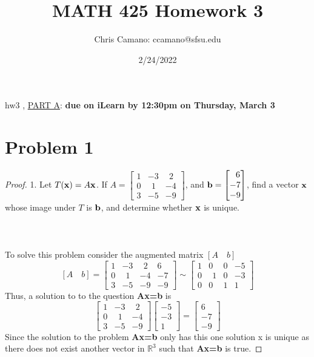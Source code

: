 \documentclass[12pt]{article}
\author{Chris Camano: ccamano@sfsu.edu}
\title{MATH 425 Homework 3 }
\date{2/24/2022}
\newcommand{\tab}{\\\\}
\newcommand{\sect}[1]{\section*{#1}}
\newcommand{\R}{\mathbb{R}}
\newcommand{\Axb}{\textbf{Ax=b} }
\begin{document}
\maketitle
\noindent
hw3 , \underline{PART A}: {\bf due on iLearn by 12:30pm on Thursday, March 3}
\vskip 10pt
\noindent

\sect{Problem 1}
\begin{proof}
  1. Let $T({\bf x}) = A{\bf x}$. If
  $A=\begin{bmatrix}
  1 & -3 & ~~2\\
  0 & ~~1 & -4\\
  3 & -5 & -9
  \end{bmatrix}$, and ${\bf b} = \begin{bmatrix}~~6\\ -7 \\ -9 \end{bmatrix}$, find a vector ${\bf x}$
  whose image under $T$ is ${\bf b}$, and determine whether ${\bf x}$ is unique.\tab\tab
  To solve this problem consider the augmented matrix $ [A \quad b]$
  \[
  [A \quad b]=\begin{bmatrix}
  1 & -3 & ~~2&6\\
  0 & ~~1 & -4&-7\\
  3 & -5 & -9&-9
  \end{bmatrix} \sim
  \begin{bmatrix}
  1 & 0 & 0&-5\\
  0 & ~~1 & 0&-3\\
  0 & 0 & 1&1
  \end{bmatrix}
  \]
  Thus, a solution to to the question \Axb is
  \[
  \begin{bmatrix}
  1 & -3 & ~~2\\
  0 & ~~1 & -4\\
  3 & -5 & -9
  \end{bmatrix}
  \begin{bmatrix}
    -5\\-3\\1
  \end{bmatrix}=
  \begin{bmatrix}
    6\\-7\\-9
  \end{bmatrix}
  \]
  Since the solution to the problem \Axb only has this one solution x is unique as there does not exist another vector in $\R^3$ such that \Axb is true.
  \noindent
\end{proof}\tab\tab
\end{document}
